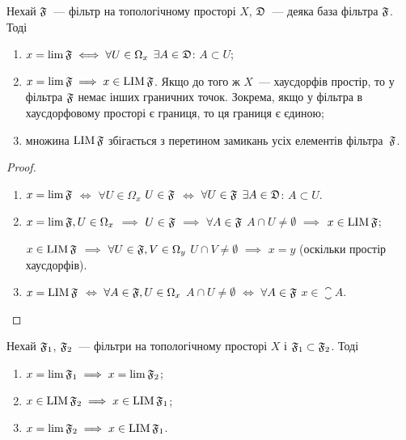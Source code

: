 \begin{theorem}
    \label{th:filterbase-limits-limitpoitns}
    Нехай $\frak F$~--- фільтр на топологічному просторі $X$, $\frak D$~--- деяка база фільтра $\frak F$. Тоді
    \begin{enumerate}
        \item $x = \lim \frak F \iff \forall U \in \Omega_x$ $\exists A \in \frak D$: $A \subset U$;
        \item $x = \lim \frak F \implies x \in \LIM \frak F$. Якщо до того ж $X$~--- хаусдорфів простір, то у фільтра $\frak F$ немає інших граничних точок. Зокрема, якщо у фільтра в хаусдорфовому просторі є границя, то ця границя є єдиною;
        \item множина $\LIM \frak F$ збігається з перетином замикань усіх елементів фільтра~$\frak F$.
    \end{enumerate}
\end{theorem}

\begin{proof}
    \listhack
    \begin{enumerate}
        \item $x = \lim \frak F$ $\iff$ $\forall U \in \Omega_x$ $U \in \frak F$ $\iff$ $\forall U \in \frak F$ $\exists A \in \frak D$: $A \subset U$.

        \item $x = \lim \frak F, U \in \Omega_x$ $\implies$ $U \in \frak F$ $\implies$ $\forall A \in \frak F$ $A \cap U \ne \emptyset$ $\implies$ $x \in \LIM \frak F$;
        
        $x \in \LIM \frak F$ $\implies$ $\forall U \in \frak F, V \in \Omega_y$ $U \cap V \ne \emptyset$ $\implies$ $x = y$ (оскільки простір хаусдорфів).

        \item $x = \LIM \frak F$ $\iff$ $\forall A \in \frak F, U \in \Omega_x$ $A \cap U \ne \emptyset$ $\iff$ $\forall A \in \frak F$ $x \in \closure A$. \qedhere
    \end{enumerate}
\end{proof}

\begin{theorem}
    \label{th:filters-limits-limitpoitns}
    Нехай $\frak F_1$, $\frak F_2$~--- фільтри на топологічному просторі $X$ і $\frak F_1 \subset \frak F_2$. Тоді
    \begin{enumerate}
        \item $x = \lim \frak F_1 \implies x = \lim \frak F_2$;
        \item $x \in \LIM \frak F_2 \implies x \in \LIM \frak F_1$;
        \item $x = \lim \frak F_2 \implies x \in \LIM \frak F_1$.
    \end{enumerate}
\end{theorem}

